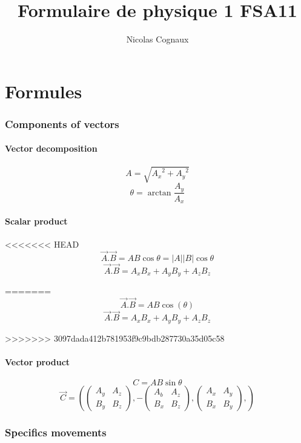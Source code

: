 \documentclass[a4paper,10pt]{article}
\title{Formulaire de physique 1 FSA11}
\author{Nicolas Cognaux}
\begin{document}
\maketitle

\newpage
\part{Formules}

\section{Components of vectors}
\subsection{Vector decomposition}
\[ A = \sqrt{{A_x}^2 + {A_y}^2} \]
\[ \theta = \arctan{\frac{A_y}{A_x}} \]

\subsection{Scalar product}
<<<<<<< HEAD
\[ \vec{A}.\vec{B} = AB\cos{\theta} = |A||B|\cos{\theta} \]
\[ \vec{A}.\vec{B} = A_x B_x + A_y B_y + A_z B_z \]

=======
\[ \vec{A}.\vec{B} = AB\cos(\theta) \]
\[ \vec{A}.\vec{B} = A_x B_x + A_y B_y + A_z B_z \]

>>>>>>> 3097dada412b781953f9c9bdb287730a35d05c58
\subsection{Vector product}
\[ C = AB\sin{\theta} \]
\[ \vec{C} = \left( \begin{pmatrix}
	  A_y&A_z \\
	  B_y&B_z
          \end{pmatrix}, - \begin{pmatrix}
	  A_b&A_z \\
	  B_x&B_z
          \end{pmatrix}, \begin{pmatrix}
	  A_x&A_y \\
	  B_x&B_y
          \end{pmatrix},\right)
\]

\section{Specifics movements}
\end{document}

